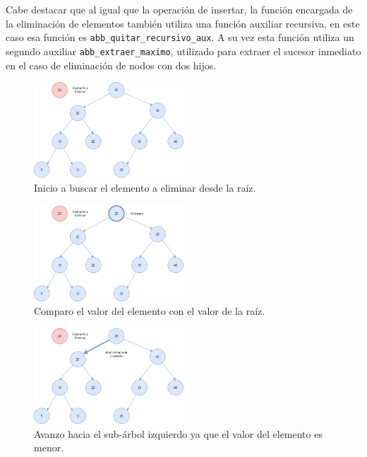 \documentclass[titlepage,a4paper]{article}
\begin{document}
Cabe destacar que al igual que la operación de insertar, la función encargada
de la eliminación de elementos también utiliza una función auxiliar recursiva,
en este caso esa función es \lstinline{abb_quitar_recursivo_aux}. A su vez esta
función utiliza un segundo auxiliar \lstinline{abb_extraer_maximo},
utilizado para extraer el sucesor inmediato en el caso de eliminación de nodos
con dos hijos.

\begin{figure}[H]
\centering
\includegraphics[width=0.5\textwidth]{eliminacion_1.png}
\caption{\label{fig:seq08}Inicio a buscar el elemento a eliminar desde la raíz.}
\end{figure}

\begin{figure}[H]
\centering
\includegraphics[width=0.5\textwidth]{eliminacion_2.png}
\caption{\label{fig:seq09}Comparo el valor del elemento con el valor de la raíz.}
\end{figure}

\begin{figure}[H]
\centering
\includegraphics[width=0.5\textwidth]{eliminacion_3.png}
\caption{\label{fig:seq10}Avanzo hacia el sub-árbol izquierdo ya que el valor del elemento es menor.}
\end{figure}
\end{document}
